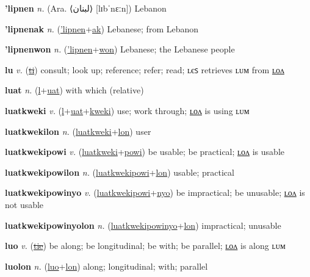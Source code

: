 \textbf{\hypertarget{'lipnen}{'lipnen}} \textit{n.} (Ara. ⟨{\arabics{}لبنان‎}⟩ [lɪbˈnɛːn])
Lebanon

\textbf{\hypertarget{'lipnenak}{'lipnenak}} \textit{n.} (\hyperlink{'lipnen}{'lipnen}+\allowbreak \hyperlink{ak}{ak})
Lebanese; from Lebanon

\textbf{\hypertarget{'lipnenwon}{'lipnenwon}} \textit{n.} (\hyperlink{'lipnen}{'lipnen}+\allowbreak \hyperlink{won}{won})
Lebanese; the Lebanese people

\textbf{\hypertarget{lu}{lu}} \textit{v.} (\hyperlink{ti}{\sout{ti}})
consult; look up; reference; refer; read; ʟєꜱ retrieves ʟᴜᴍ from \hyperlink{lulon}{ʟᴏᴧ}

\textbf{\hypertarget{luat}{luat}} \textit{n.} (\hyperlink{l}{l}+\allowbreak \hyperlink{uat}{uat})
with which (relative)

\textbf{\hypertarget{luatkweki}{luatkweki}} \textit{v.} (\hyperlink{l}{l}+\allowbreak \hyperlink{uat}{uat}+\allowbreak \hyperlink{kweki}{kweki})
use; work through; \hyperlink{luatkwekilon}{ʟᴏᴧ} is using ʟᴜᴍ

\textbf{\hypertarget{luatkwekilon}{luatkwekilon}} \textit{n.} (\hyperlink{luatkweki}{luatkweki}+\allowbreak \hyperlink{lon}{lon})
user

\textbf{\hypertarget{luatkwekipowi}{luatkwekipowi}} \textit{v.} (\hyperlink{luatkweki}{luatkweki}+\allowbreak \hyperlink{powi}{powi})
be usable; be practical; \hyperlink{luatkwekipowilon}{ʟᴏᴧ} is usable

\textbf{\hypertarget{luatkwekipowilon}{luatkwekipowilon}} \textit{n.} (\hyperlink{luatkwekipowi}{luatkwekipowi}+\allowbreak \hyperlink{lon}{lon})
usable; practical

\textbf{\hypertarget{luatkwekipowinyo}{luatkwekipowinyo}} \textit{v.} (\hyperlink{luatkwekipowi}{luatkwekipowi}+\allowbreak \hyperlink{nyo}{nyo})
be impractical; be unusable; \hyperlink{luatkwekipowinyolon}{ʟᴏᴧ} is not usable

\textbf{\hypertarget{luatkwekipowinyolon}{luatkwekipowinyolon}} \textit{n.} (\hyperlink{luatkwekipowinyo}{luatkwekipowinyo}+\allowbreak \hyperlink{lon}{lon})
impractical; unusable

\textbf{\hypertarget{luo}{luo}} \textit{v.} (\hyperlink{tie}{\sout{tie}})
be along; be longitudinal; be with; be parallel; \hyperlink{luolon}{ʟᴏᴧ} is along ʟᴜᴍ

\textbf{\hypertarget{luolon}{luolon}} \textit{n.} (\hyperlink{luo}{luo}+\allowbreak \hyperlink{lon}{lon})
along; longitudinal; with; parallel

